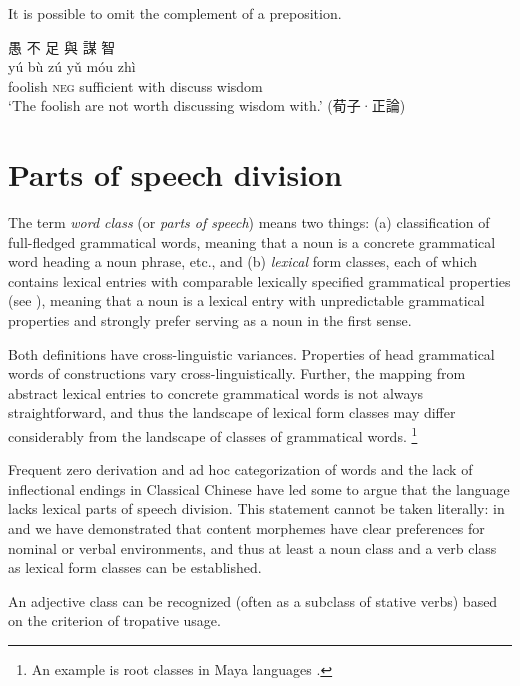 \documentclass[UTF8, a4paper, oneside, scheme=plain, 12pt]{ctexrep}
\newcommand*{\citepage}[1]{p.~{#1}}
\newcommand*{\term}[1]{\emph{#1}}
\newcommand{\translate}[1]{`#1'}
\newcommand*{\category}[1]{\textsc{#1}}
\begin{document}
It is possible to omit the complement of a preposition.

\begin{exe}
    \ex\label{ex:grammatical.np.preposition.omission.1}
    \glll
    愚 不 足 與 謀 智 \\
    yú bù zú yǔ móu zhì \\
    foolish \category{neg} sufficient with discuss wisdom \\
    \glt\translate{The foolish are not worth discussing wisdom with.} \hfill (荀子·正論)
\end{exe}

\section{Parts of speech division}\label{sec:grammatical.pos}

The term \term{word class} (or \term{parts of speech}) means two things:
(a) classification of full-fledged grammatical words, meaning that a noun is a concrete grammatical word heading a noun phrase, etc., and (b) \emph{lexical} form classes, each of which contains lexical entries with comparable lexically specified grammatical properties (see ), meaning that a noun is a lexical entry with unpredictable grammatical properties and strongly prefer serving as a noun in the first sense.


Both definitions have cross-linguistic variances.
Properties of head grammatical words of constructions vary cross-linguistically.
Further, the mapping from abstract lexical entries to concrete grammatical words is not always straightforward,
and thus the landscape of lexical form classes may differ considerably from the landscape of classes of grammatical words.%
\footnote{
    An example is root classes in Maya languages \citep[\citepage{372}]{siddiqi2020routledge}.
}

Frequent zero derivation and ad hoc categorization of words and the lack of inflectional endings in Classical Chinese have led some to argue that the language lacks lexical parts of speech division.
This statement cannot be taken literally: 
in  and 
we have demonstrated that content morphemes have clear preferences for nominal or verbal environments,
and thus at least a noun class and a verb class as lexical form classes can be established.

An adjective class can be recognized (often as a subclass of stative verbs) based on the criterion of tropative usage.
\end{document}
